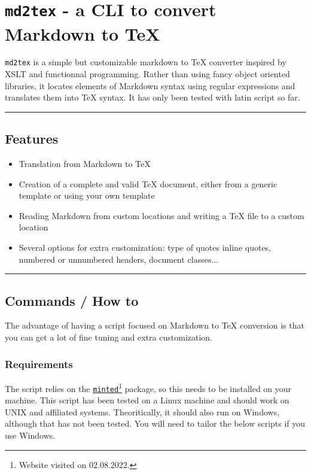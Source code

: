\documentclass[a4paper, 12pt, twoside]{article}
\begin{document}
\section{\texttt{md2tex} - a CLI to convert Markdown to TeX}

\texttt{md2tex} is a simple but customizable markdown to TeX converter inspired by XSLT and functionnal programming. 
Rather than using fancy object oriented libraries, it locates elements of Markdown syntax using regular 
expressions and translates them into TeX syntax. It has only been tested with latin script so far.

\par\noindent\rule{\linewidth}{0.4pt}
\subsection{Features}

\begin{itemize}
\item Translation from Markdown to TeX
\item Creation of a complete and valid TeX document, either from a generic template or using your own template
\item Reading Markdown from custom locations and writing a TeX file to a custom location
\item Several options for extra customization: type of quotes inline quotes, numbered or unnumbered headers, document classes... 
\end{itemize}

\par\noindent\rule{\linewidth}{0.4pt}
\subsection{Commands / How to}

The advantage of having a script focused on Markdown to TeX conversion is that you can get a lot of fine tuning
and extra customization.
\subsubsection{Requirements}

The script relies on the \href{http://tug.ctan.org/macros/latex/contrib/minted/minted.pdf}{\texttt{minted}}\footnote{Website visited on 02.08.2022.} package,
so this needs to be installed on your machine. This script has been tested on a Linux machine and should
work on UNIX and affiliated systems. Theoritically, it should also run on Windows, although that has not
been tested. You will need to tailor the below scripts if you use Windows.
\end{document}
